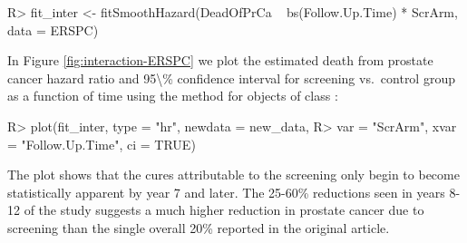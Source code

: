 \documentclass[
]{jss}
\begin{document}
\begin{CodeChunk}

\begin{CodeInput}
R> fit_inter <- fitSmoothHazard(DeadOfPrCa ~ bs(Follow.Up.Time) * ScrArm, data = ERSPC)
\end{CodeInput}
\end{CodeChunk}

In Figure \ref{fig:interaction-ERSPC} we plot the estimated death from
prostate cancer hazard ratio and 95\textbackslash\% confidence interval
for screening vs.~control group as a function of time using the
 method for objects of class :

\begin{CodeChunk}

\begin{CodeInput}
R> plot(fit_inter, type = "hr", newdata = new_data,
R>      var = "ScrArm", xvar = "Follow.Up.Time", ci = TRUE)
\end{CodeInput}
\end{CodeChunk}

The plot shows that the cures attributable to the screening only begin
to become statistically apparent by year 7 and later. The 25-60\%
reductions seen in years 8-12 of the study suggests a much higher
reduction in prostate cancer due to screening than the single overall
20\% reported in the original article.
\end{document}
